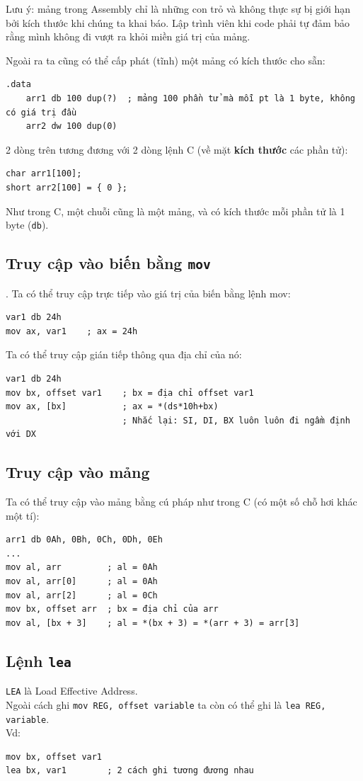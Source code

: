 \documentclass[12pt]{report}
\newcommand{\code}[1]{\texttt{#1}}
\begin{document}
Lưu ý: mảng trong Assembly chỉ là những con trỏ và không thực sự bị giới hạn bởi kích thước khi chúng ta khai báo. Lập trình viên khi code phải tự đảm bảo rằng mình không đi vượt ra khỏi miền giá trị của mảng.

Ngoài ra ta cũng có thể cấp phát (tĩnh) một mảng có kích thước cho sẵn:
\begin{verbatim}
.data
    arr1 db 100 dup(?)  ; mảng 100 phần tử mà mỗi pt là 1 byte, không có giá trị đầu
    arr2 dw 100 dup(0)
\end{verbatim}
2 dòng trên tương đương với 2 dòng lệnh C (về mặt \textbf{kích thước} các phần tử):
\begin{verbatim}
char arr1[100];
short arr2[100] = { 0 }; 
\end{verbatim}

Như trong C, một chuỗi cũng là một mảng, và có kích thước mỗi phần tử là 1 byte (\code{db}).

\subsection{Truy cập vào biến bằng \code{mov}}.
Ta có thể truy cập trực tiếp vào giá trị của biến bằng lệnh mov:
\begin{verbatim}
var1 db 24h
mov ax, var1    ; ax = 24h
\end{verbatim}
Ta có thể truy cập gián tiếp thông qua địa chỉ của nó:
\begin{verbatim}
var1 db 24h            
mov bx, offset var1    ; bx = địa chỉ offset var1
mov ax, [bx]           ; ax = *(ds*10h+bx) 
                       ; Nhắc lại: SI, DI, BX luôn luôn đi ngầm định với DX
\end{verbatim}

\subsection{Truy cập vào mảng}
Ta có thể truy cập vào mảng bằng cú pháp như trong C (có một số chỗ hơi khác một tí):
\begin{verbatim}
arr1 db 0Ah, 0Bh, 0Ch, 0Dh, 0Eh 
... 
mov al, arr         ; al = 0Ah 
mov al, arr[0]      ; al = 0Ah 
mov al, arr[2]      ; al = 0Ch 
mov bx, offset arr  ; bx = địa chỉ của arr
mov al, [bx + 3]    ; al = *(bx + 3) = *(arr + 3) = arr[3]
\end{verbatim}

\subsection{Lệnh \code{lea}}
\code{LEA} là Load Effective Address.\\
Ngoài cách ghi \code{mov REG, offset variable} ta còn có thể ghi là \code{lea REG, variable}.\\
Vd:
\begin{verbatim}
mov bx, offset var1 
lea bx, var1        ; 2 cách ghi tương đương nhau
\end{verbatim}
\end{document}
